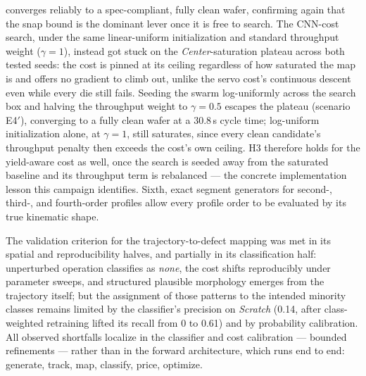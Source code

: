 converges reliably to a spec-compliant, fully clean wafer, confirming again that the snap bound is the dominant lever once it is free to search. The CNN-cost search, under the same linear-uniform initialization and standard throughput weight ($\gamma = 1$), instead got stuck on the \textit{Center}-saturation plateau across both tested seeds: the cost is pinned at its ceiling regardless of how saturated the map is and offers no gradient to climb out, unlike the servo cost's continuous descent even while every die still fails. Seeding the swarm log-uniformly across the search box and halving the throughput weight to $\gamma = 0.5$ escapes the plateau (scenario E4$'$), converging to a fully clean wafer at a $30.8$\,s cycle time; log-uniform initialization alone, at $\gamma = 1$, still saturates, since every clean candidate's throughput penalty then exceeds the cost's own ceiling. H3 therefore holds for the yield-aware cost as well, once the search is seeded away from the saturated baseline and its throughput term is rebalanced --- the concrete implementation lesson this campaign identifies. Sixth, exact segment generators for second-, third-, and fourth-order profiles allow every profile order to be evaluated by its true kinematic shape.

The validation criterion for the trajectory-to-defect mapping was met in its spatial and reproducibility halves, and partially in its classification half: unperturbed operation classifies as \textit{none}, the cost shifts reproducibly under parameter sweeps, and structured plausible morphology emerges from the trajectory itself; but the assignment of those patterns to the intended minority classes remains limited by the classifier's precision on \textit{Scratch} (0.14, after class-weighted retraining lifted its recall from 0 to 0.61) and by probability calibration. All observed shortfalls localize in the classifier and cost calibration --- bounded refinements --- rather than in the forward architecture, which runs end to end: generate, track, map, classify, price, optimize.

